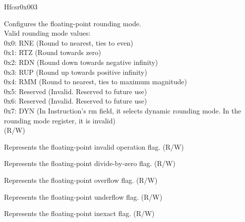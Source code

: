 \begin{register}{H}{fcsr}{0x003}\label{regdesc:FCSR}
%
%
%
%
%
%
%
\regnewline%
\begin{regdesc}\begin{reglist}
\label{fielddesc:FCSR_FRM}\item [FRM] Configures the floating-point rounding mode.\\
Valid rounding mode values:\\
0x0: RNE (Round to nearest, ties to even)\\
0x1: RTZ (Round towards zero)\\
0x2: RDN (Round down towards negative infinity)\\
0x3: RUP (Round up towards positive infinity)\\
0x4: RMM (Round to nearest, ties to maximum magnitude)\\
0x5: Reserved (Invalid. Reserved to future use)\\
0x6: Reserved (Invalid. Reserved to future use)\\
0x7: DYN (In Instruction's rm field, it selects dynamic rounding mode. In the rounding mode register, it is invalid)\\
(R/W)
\label{fielddesc:FCSR_FFLAGS_NV}\item [NV] Represents the floating-point invalid operation flag. (R/W)
\label{fielddesc:FCSR_FFLAGS_DZ}\item [DZ] Represents the floating-point divide-by-zero flag. (R/W)
\label{fielddesc:FCSR_FFLAGS_OF}\item [OF] Represents the floating-point overflow flag. (R/W)
\label{fielddesc:FCSR_FFLAGS_UF}\item [UF] Represents the floating-point underflow flag. (R/W)
\label{fielddesc:FCSR_FFLAGS_NX}\item [NX] Represents the floating-point inexact flag. (R/W)
\end{reglist}\end{regdesc}
\end{register}


